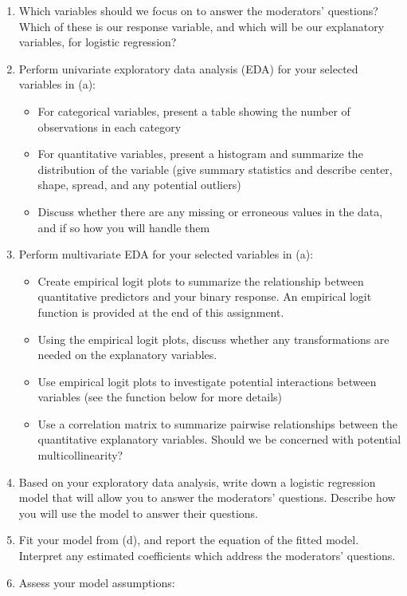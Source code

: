 \documentclass[11pt]{article}
\begin{document}
\begin{enumerate}
\begin{enumerate}
\item Which variables should we focus on to answer the moderators' questions? Which of these is our response variable, and which will be our explanatory variables, for logistic regression?
\item Perform univariate exploratory data analysis (EDA) for your selected variables in (a): 
\begin{itemize}
\item For categorical variables, present a table showing the number of observations in each category
\item For quantitative variables, present a histogram and summarize the distribution of the variable (give summary statistics and describe center, shape, spread, and any potential outliers)
\item Discuss whether there are any missing or erroneous values in the data, and if so how you will handle them
\end{itemize}
\item Perform multivariate EDA for your selected variables in (a):
\begin{itemize}
\item Create empirical logit plots to summarize the relationship between quantitative predictors and your binary response. An empirical logit function is provided at the end of this assignment.
\item Using the empirical logit plots, discuss whether any transformations are needed on the explanatory variables.
\item Use empirical logit plots to investigate potential interactions between variables (see the function below for more details)
\item Use a correlation matrix to summarize pairwise relationships between the quantitative explanatory variables. Should we be concerned with potential multicollinearity?
\end{itemize}
\item Based on your exploratory data analysis, write down a logistic regression model that will allow you to answer the moderators' questions. Describe how you will use the model to answer their questions.
\item Fit your model from (d), and report the equation of the fitted model. Interpret any estimated coefficients which address the moderators' questions.
\item Assess your model assumptions:
\begin{itemize}

\end{itemize}
\end{enumerate}
\end{enumerate}
\end{document}
